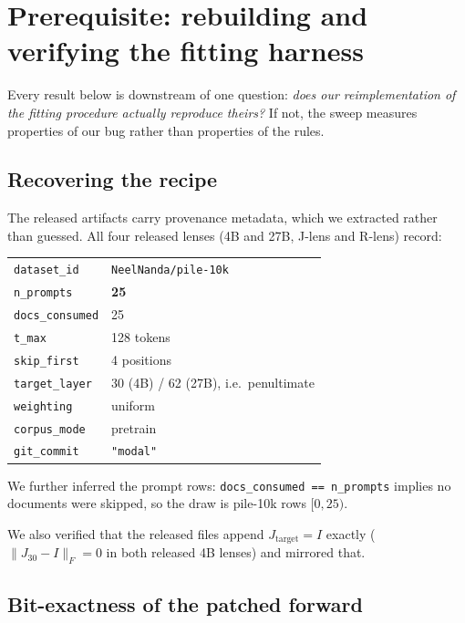 \documentclass[11pt,a4paper]{article}
\newcommand{\jlens}{J\nobreakdash-lens}
\newcommand{\rlens}{R\nobreakdash-lens}
\begin{document}
\section{Prerequisite: rebuilding and verifying the fitting harness}

Every result below is downstream of one question: \emph{does our reimplementation of
the fitting procedure actually reproduce theirs?} If not, the sweep measures
properties of our bug rather than properties of the rules.

\subsection{Recovering the recipe}

The released artifacts carry provenance metadata, which we extracted rather than
guessed. All four released lenses (4B and 27B, \jlens{} and \rlens) record:

\begin{center}
\begin{tabular}{@{}ll@{}}
\toprule
\texttt{dataset\_id}   & \texttt{NeelNanda/pile-10k} \\
\texttt{n\_prompts}    & \textbf{25} \\
\texttt{docs\_consumed}& 25 \\
\texttt{t\_max}        & 128 tokens \\
\texttt{skip\_first}   & 4 positions \\
\texttt{target\_layer} & 30 (4B) / 62 (27B), i.e.\ penultimate \\
\texttt{weighting}     & uniform \\
\texttt{corpus\_mode}  & pretrain \\
\texttt{git\_commit}   & \texttt{"modal"} \\
\bottomrule
\end{tabular}
\end{center}

\noindent
We further inferred the prompt rows: \texttt{docs\_consumed == n\_prompts} implies no
documents were skipped, so the draw is pile-10k rows $[0,25)$.

We also verified that the released files append $J_{\text{target}} = I$ exactly
($\|J_{30} - I\|_F = 0$ in both released 4B lenses) and mirrored that.

\subsection{Bit-exactness of the patched forward}
\end{document}
